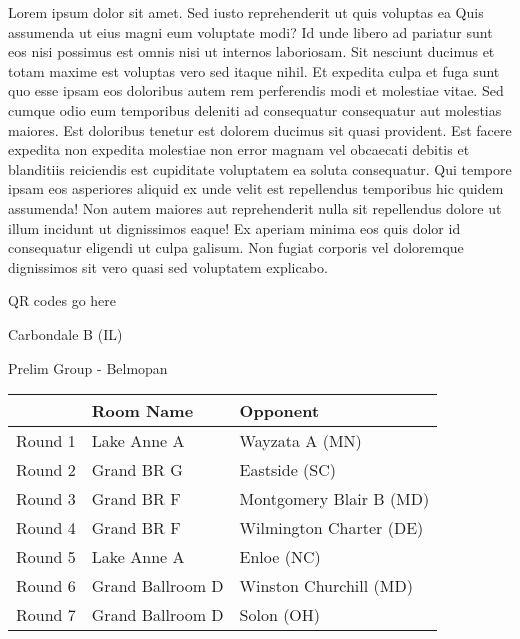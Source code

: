\documentclass{article}%
\begin{document}
\vspace*{8pt}%
\linebreak%
\newline%
\newline%
Lorem ipsum dolor sit amet. Sed iusto reprehenderit ut quis voluptas ea Quis assumenda ut eius magni eum voluptate modi? Id unde libero ad pariatur sunt eos nisi possimus est omnis nisi ut internos laboriosam. Sit nesciunt ducimus et totam maxime est voluptas vero sed itaque nihil. Et expedita culpa et fuga sunt quo esse ipsam eos doloribus autem rem perferendis modi et molestiae vitae.\newline%
\newline%
Sed cumque odio eum temporibus deleniti ad consequatur consequatur aut molestias maiores. Est doloribus tenetur est dolorem ducimus sit quasi provident. Est facere expedita non expedita molestiae non error magnam vel obcaecati debitis et blanditiis reiciendis est cupiditate voluptatem ea soluta consequatur. Qui tempore ipsam eos asperiores aliquid ex unde velit est repellendus temporibus hic quidem assumenda!\newline%
\newline%
Non autem maiores aut reprehenderit nulla sit repellendus dolore ut illum incidunt ut dignissimos eaque! Ex aperiam minima eos quis dolor id consequatur eligendi ut culpa galisum. Non fugiat corporis vel doloremque dignissimos sit vero quasi sed voluptatem explicabo.\newline%
\newline%
%
\vspace*{30pt}%
\begin{center}%
\begin{Huge}%
QR codes go here%
\end{Huge}%
\end{center}%
\newpage%
%
\begin{center}%
\begin{Huge}%
Carbondale B (IL)%
\end{Huge}%
\vspace*{8pt}%
\linebreak%
\begin{Large}%
Prelim Group {-} Belmopan%
\end{Large}%
\end{center}%
\begin{tabularx}{\textwidth}{|c|Y|Y|}%
\hline%
&Room Name&Opponent\\%
\hline%
Round 1&Lake Anne A&Wayzata A (MN)\\%
Round 2&Grand BR G&Eastside (SC)\\%
Round 3&Grand BR F&Montgomery Blair B (MD)\\%
Round 4&Grand BR F&Wilmington Charter (DE)\\%
Round 5&Lake Anne A&Enloe (NC)\\%
Round 6&Grand Ballroom D&Winston Churchill (MD)\\%
Round 7&Grand Ballroom D&Solon (OH)\\%
\hline%
\end{tabularx}%
\end{document}
